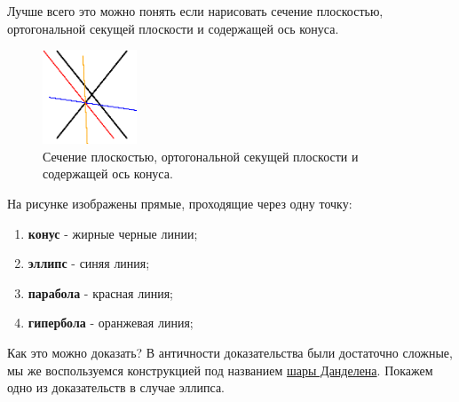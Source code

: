 \documentclass[12pt]{article}
\theoremstyle{definition}
\begin{document}
Лучше всего это можно понять если нарисовать сечение плоскостью, ортогональной секущей плоскости и содержащей ось конуса.
\begin{figure}[H]
	\centering
	\includegraphics[width=0.25\textwidth]{ANGL1_8.eps}
	\caption{Сечение плоскостью, ортогональной секущей плоскости и содержащей ось конуса.}
	\label{1_8}
\end{figure}
На рисунке изображены прямые, проходящие через одну точку: 
\begin{enumerate}[label=\arabic*)]
	\item \textbf{конус} - жирные черные линии;
	\item \textbf{эллипс} - синяя линия;
	\item \textbf{парабола} - красная линия;
	\item \textbf{гипербола} - оранжевая линия;
\end{enumerate}
Как это можно доказать? В античности доказательства были достаточно сложные, мы же воспользуемся конструкцией под названием \uline{шары Данделена}. Покажем одно из доказательств в случае эллипса.
\end{document}
